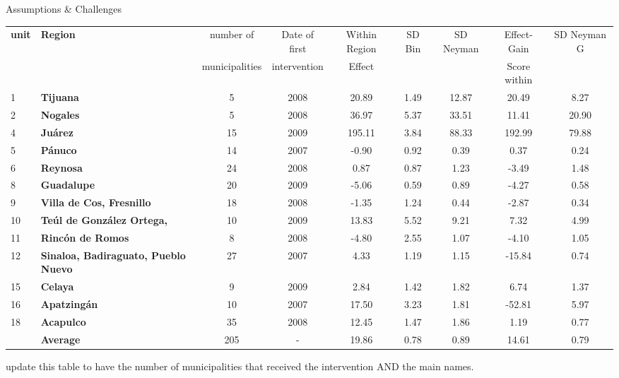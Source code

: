 \documentclass[final]{beamer}
\newlength{\threecolwid}
\begin{document}
\begin{frame}[t]
\begin{columns}[t]
\begin{column}{\threecolwid}
\begin{block}{Assumptions \& Challenges}
\begin{itemize}
\begin{itemize}
		\begin{table}[ht]
		\begin{center}
		\begin{tabular}{llccccccc}
		  \hline
		 \textbf{unit}& \textbf{Region}& number of& Date of first & Within Region & SD Bin& SD Neyman &Effect- Gain&SD Neyman G\\
		 && municipalities& intervention& Effect&&& Score within&\\
		  \hline
		1&\textbf{Tijuana} &   5 & 2008 &20.89 & 1.49 & 12.87&20.49 & 8.27 \\  
		2&		  \textbf{Nogales} &   5 & 2008 &36.97 & 5.37 & 33.51& 11.41 & 20.90 \\
		4&		  \textbf{Ju\'{a}rez} &  15 & 2009 & 195.11 & 3.84 & 88.33 & 192.99 & 79.88 \\   
		5&		  \textbf{P\'{a}nuco} &  14 & 2007 &  -0.90 & 0.92 & 0.39& 0.37 & 0.24 \\
		6&		  \textbf{Reynosa} &  24 & 2008 &  0.87 & 0.87 & 1.23  & -3.49 & 1.48 \\  
		8&		  \textbf{Guadalupe} &  20 & 2009 &  -5.06 & 0.59 & 0.89 & -4.27 & 0.58 \\  
		9&		  \textbf{Villa de Cos, Fresnillo} &  18 & 2008 &-1.35 & 1.24 & 0.44 & -2.87 & 0.34 \\  
		10&		\textbf{Te\'{u}l de Gonz\'{a}lez Ortega,} &10 & 2009&13.83 & 5.52 & 9.21& 7.32 & 4.99 \\ 
		11&		\textbf{Rinc\'{o}n de Romos} & 8 & 2008&-4.80 & 2.55 & 1.07& -4.10 & 1.05\\
		12&		\textbf{Sinaloa, Badiraguato, Pueblo Nuevo} &27 & 2007& 4.33 & 1.19 & 1.15 & -15.84 & 0.74 \\ 
		15&		\textbf{Celaya} &9 & 2009  &2.84 & 1.42 & 1.82& 6.74 & 1.37 \\ 
		16&		\textbf{Apatzing\'{a}n} &10 & 2007 &17.50 & 3.23 & 1.81 &-52.81 & 5.97 \\  
		18&		\textbf{Acapulco} &35 & 2008 & 12.45 & 1.47 & 1.86 & 1.19 & 0.77 \\ 
		&		 \textbf{Average}& 205& - &19.86& 0.78&  0.89&14.61& 0.79\\
		\hline
		\end{tabular}
		\end{center}
		\end{table}
		update this table to have the number of municipalities that received the intervention AND the main names.

\end{itemize}
\end{itemize}
\end{block}
\end{column}
\end{columns}
\end{frame}
\end{document}
